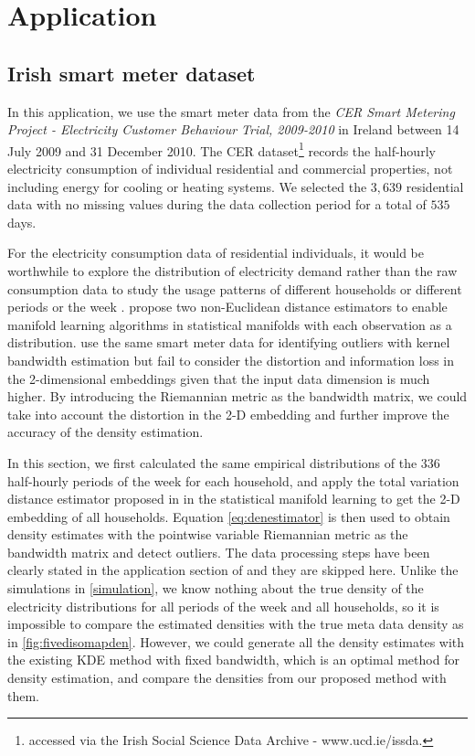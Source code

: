 \documentclass[11pt,a4paper,]{article}
\begin{document}
\hypertarget{application}{%
\section{Application}\label{application}}

\hypertarget{irish-smart-meter-dataset}{%
\subsection{Irish smart meter dataset}\label{irish-smart-meter-dataset}}

In this application, we use the smart meter data from the \emph{CER Smart Metering Project - Electricity Customer Behaviour Trial, 2009-2010} in Ireland \autocite{cer2012-data} between 14 July 2009 and 31 December 2010. The CER dataset\footnote{accessed via the Irish Social Science Data Archive - www.ucd.ie/issda.} records the half-hourly electricity consumption of individual residential and commercial properties, not including energy for cooling or heating systems. We selected the \(3,639\) residential data with no missing values during the data collection period for a total of
\(535\) days.

For the electricity consumption data of residential individuals, it would be worthwhile to explore the distribution of electricity demand rather than the raw consumption data to study the usage patterns of different households or different periods or the week \autocite{Hyndman2018-ia}.
\textcite{Cheng2021-ex} propose two non-Euclidean distance estimators to enable manifold learning algorithms in statistical manifolds with each observation as a distribution. \textcite{Cheng2021-ex} use the same smart meter data for identifying outliers with kernel bandwidth estimation but fail to consider the distortion and information loss in the 2-dimensional embeddings given that the input data dimension is much higher. By introducing the Riemannian metric as the bandwidth matrix, we could take into account the distortion in the 2-D embedding and further improve the accuracy of the density estimation.

In this section, we first calculated the same empirical distributions of the \(336\) half-hourly periods of the week for each household, and apply the total variation distance estimator proposed in \textcite{Cheng2021-ex} in the statistical manifold learning to get the 2-D embedding of all households. Equation \eqref{eq:denestimator} is then used to obtain density estimates with the pointwise variable Riemannian metric as the bandwidth matrix and detect outliers. The data processing steps have been clearly
stated in the application section of \textcite{Cheng2021-ex} and they are skipped here. Unlike the simulations in \autoref{simulation}, we know nothing about the true density of the electricity distributions for all periods of the week and all households, so it is impossible to compare the estimated densities with the true meta data density as in \autoref{fig:fivedisomapden}. However, we could generate all the density estimates with the existing KDE method with fixed bandwidth, which is an optimal method for density estimation, and compare the densities from our proposed method with them.
\end{document}
